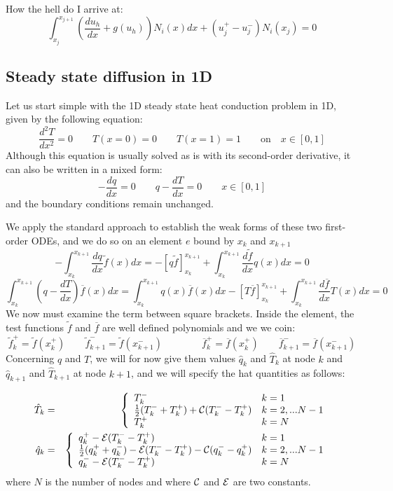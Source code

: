 How the hell do I arrive at:
\[
\int_{x_j}^{x_{j+1}} \left( \frac{d u_h}{dx} + g(u_h) \right) N_i(x) dx + (u_j^+-u_j^-) N_i(x_j) = 0
\]

\newpage
\subsection{Steady state diffusion in 1D}

Let us start simple with the 1D steady state heat conduction problem in 1D, given by the following 
equation:
\begin{equation}
\frac{d^2T}{dx^2}=0 \qquad T(x=0)=0 \qquad T(x=1)=1 \qquad \text{on} \quad x\in[0,1]
\end{equation}
Although this equation is usually solved as is with its second-order derivative, it can also 
be written in a mixed form:
\[
-\frac{dq}{dx}=0 \qquad q-\frac{dT}{dx}=0 \qquad x\in[0,1]
\]
and the boundary conditions remain unchanged. 

We apply the standard approach to establish the weak forms of these two first-order ODEs, and we do so 
on an element $e$ bound by $x_k$ and $x_{k+1}$
\[
-\int_{x_k}^{x_{k+1}} \frac{dq}{dx} \tilde{f}(x) dx = -[q \tilde{f} ]_{x_k}^{x_{k+1}} 
+ \int_{x_k}^{x_{k+1}} \frac{d\tilde{f}}{dx} q(x) dx = 0
\]
\[
\int_{x_k}^{x_{k+1}}  \left( q-\frac{dT}{dx} \right) \overline{f}(x) dx
=
\int_{x_k}^{x_{k+1}}  q(x) \overline{f}(x) dx
-[ T \overline{f}  ]_{x_k}^{x_{k+1}} + \int_{x_k}^{x_{k+1}} \frac{d\overline{f}}{dx} T(x) dx = 0
\]
We now must examine the term between square brackets. 
Inside the element, the test functions $\tilde{f}$ and $\overline{f}$ are well defined polynomials
and we we coin:
\[
\tilde{f}_k^+=\tilde{f}(x_k^+)
\qquad
\tilde{f}_{k+1}^-=\tilde{f}(x_{k+1}^-)
\qquad
\qquad
\overline{f}_k^+=\overline{f}(x_k^+)
\qquad
\overline{f}_{k+1}^-=\overline{f}(x_{k+1}^-)
\]
Concerning $q$ and $T$, we will for now  give them values $\hat{q}_k$ and $\hat{T}_k$ at node $k$
and $\hat{q}_{k+1}$ and $\hat{T}_{k+1}$ at node $k+1$, and we will specify the hat quantities as follows:

\begin{eqnarray}
\hat{T}_k &=&
\left\{
\begin{array}{ll}
T_k^-   & k=1 \\ 
\frac{1}{2}(T_k^-+T_k^+) + {\cal C} (T_k^- - T_k^+) & k=2,...N-1\\
T_k^+    & k=N \\ 
\end{array}
\right. \nonumber\\
\hat{q}_k &=&
\left\{
\begin{array}{ll}
q_k^+ -{\cal E} (T_k^--T_k^+)  & k=1 \\ 
\frac{1}{2}(q_k^+ + q_k^-) - {\cal E} (T_k^- - T_k^+) - {\cal C}(q_k^- - q_k^+) & k=2,...N-1\\
q_k^- -{\cal E} (T_k^--T_k^+)    & k=N \\ 
\end{array}
\right.
\end{eqnarray}
where $N$ is the number of nodes and where ${\cal C}$ and ${\cal E}$ are two constants. 

